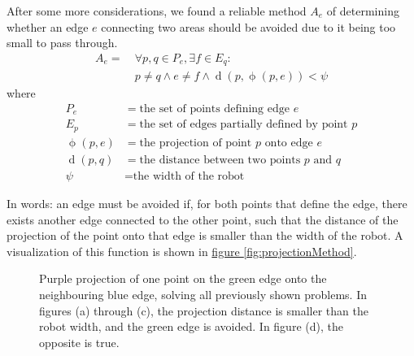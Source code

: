 \documentclass[10pt, abstracton, twocolumn]{scrartcl}
\DeclareMathOperator{\dist}{d}
\DeclareMathOperator{\proj}{\phi}
\newcommand{\fref}[1]{\hyperref[#1]{figure \vref{#1}}}
\begin{document}
\begin{samepage}

After some more considerations, we found a reliable method $A_e$ of determining whether an edge $e$ connecting two areas should be avoided due to it being too small to pass through.\textsf{}
\begin{align*}
A_e = &\ \forall p,q \in P_e, \exists f \in E_q : \\
&\ p \neq q \land e \neq f \land \dist(p,\proj(p,e)) < \psi
\end{align*}
\nopagebreak
where
\begin{align*}
P_e &= \textrm{the set of points defining edge $e$} \\
E_p &= \textrm{the set of edges partially defined by point $p$} \\
\proj(p,e) &= \textrm{the projection of point $p$ onto edge $e$} \\
\dist(p,q) &= \textrm{the distance between two points $p$ and $q$} \\
\psi &= \textrm{the width of the robot}
\end{align*}

\end{samepage}

In words: an edge must be avoided if, for both points that define the edge, there exists another edge connected to the other point, such that the distance of the projection of the point onto that edge is smaller than the width of the robot. A visualization of this function is shown in \fref{fig:projectionMethod}.

\begin{figure}
        \centering
        \begin{subfigure}[t]{0.45\columnwidth}
        \centering
        
        \subcaption{\small }
        \end{subfigure}
        \begin{subfigure}[t]{0.45\columnwidth}
        \centering
        
        \subcaption{\small }
        \end{subfigure}
        \begin{subfigure}[t]{0.45\columnwidth}
        \centering
        
        \subcaption\small {}
        \end{subfigure}
        \begin{subfigure}[t]{0.45\columnwidth}
        \centering
        
        \subcaption{\small }
        \end{subfigure}
        \caption{\small Purple projection of one point on the green edge onto the neighbouring blue edge, solving all previously shown problems. In figures (a) through (c), the projection distance is smaller than the robot width, and the green edge is avoided. In figure (d), the opposite is true.}
        \label{fig:projectionMethod}
\end{figure}
\end{document}

